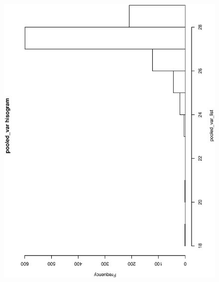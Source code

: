 \documentclass[a4paper,10pt]{article}
\begin{document}
\begin{figure}
\includegraphics[angle=-90, width=1\textwidth]{figures/math650_hw4_pooled_var_hist.eps}
\caption{}\label{f5}
\end{figure}
\end{document}
